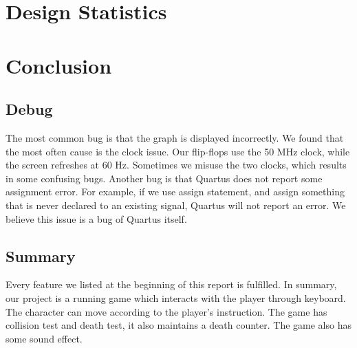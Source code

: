 \documentclass[12pt]{article}
\begin{document}
\section{Design Statistics}
\begin{table}[H]
    \centering
    \caption{Design statistics table for the project.}
\end{table}

\section{Conclusion}
\subsection{Debug}
The most common bug is that the graph is displayed incorrectly. We found that the most often cause is the clock issue. Our flip-flops use the 50 MHz clock, while the screen refreshes at 60 Hz. Sometimes we misuse the two clocks, which results in some confusing bugs.
Another bug is that Quartus does not report some assignment error. For example, if we use assign statement, and assign something that is never declared to an existing signal, Quartus will not report an error. We believe this issue is a bug of Quartus itself. 

\subsection{Summary}
Every feature we listed at the beginning of this report is fulfilled. In summary, our project is a running game which interacts with the player through keyboard. The character can move according to the player’s instruction. The game has collision test and death test, it also maintains a death counter. The game also has some sound effect. 

\newpage


\end{document}
